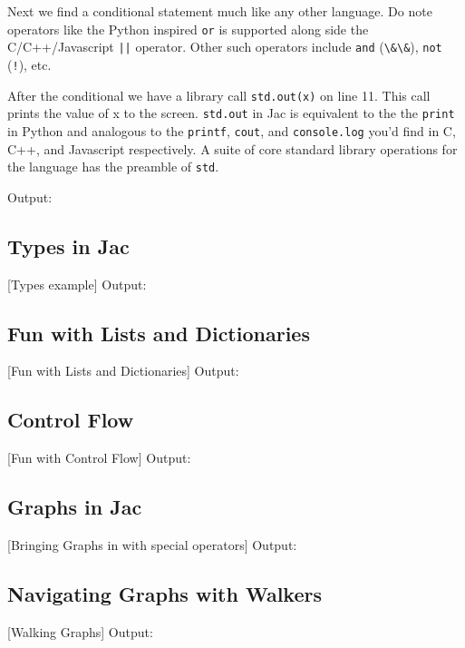 \par
Next we find a conditional statement much like any other language. Do note operators like the Python inspired \lstinline{or} is supported along side the C/C++/Javascript \lstinline{||} operator. Other such operators include \lstinline{and} (\lstinline{\&\&}), \lstinline{not} (\lstinline{!}), etc.

\par
After the conditional we have a library call \lstinline{std.out(x)} on line 11. This call prints the value of x to the screen. \lstinline{std.out} in Jac is equivalent to the the \texttt{print} in Python and analogous to the \texttt{printf}, \texttt{cout}, and \texttt{console.log} you'd find in C, C++, and Javascript respectively. A suite of core standard library operations for the language has the preamble of \lstinline{std}.

Output:


\subsection{Types in Jac}
[Types example]
Output:

\subsection{Fun with Lists and Dictionaries}
[Fun with Lists and Dictionaries]
Output:

\subsection{Control Flow}
[Fun with Control Flow]
Output:

\subsection{Graphs in Jac}
[Bringing Graphs in with special operators]
Output:

\subsection{Navigating Graphs with Walkers}
[Walking Graphs]
Output:

